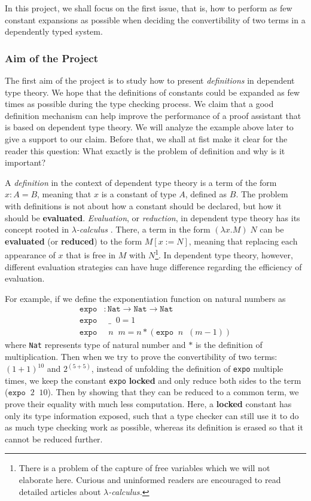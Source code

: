 \documentclass{article}
\theoremstyle{remark}
\begin{document}
In this project, we shall focus on the first issue, that is, how to perform as few constant expansions as possible when deciding the convertibility of two terms in a dependently typed system. 

\subsubsection{Aim of the Project}
The first aim of the project is to study how to present \emph{definitions} in dependent type theory. We hope that the definitions of constants could be expanded as few times as possible during the type checking process. We claim that a good definition mechanism can help improve the performance of a proof assistant that is based on dependent type theory. We will analyze the example above later to give a support to our claim. Before that, we shall at fist make it clear for the reader this question: What exactly is the problem of definition and why is it important?

A \emph{definition} in the context of dependent type theory is a term of the form $x : A = B$, meaning that $x$ is a constant of type $A$, defined as $B$. The problem with definitions is not about how a constant should be declared, but how it should be \textbf{evaluated}. \emph{Evaluation}, or \emph{reduction}, in dependent type theory has its concept rooted in \emph{$\lambda$-calculus} \cite{barendregt1984lambda}. There, a term in the form $(\lambda x . M) \;N$ can be \textbf{evaluated} (or \textbf{reduced}) to the form $M[x := N]$, meaning that replacing each appearance of $x$ that is free in $M$ with $N$\footnote{There is a problem of the capture of free variables which we will not elaborate here. Curious and uninformed readers are encouraged to read detailed articles about \emph{$\lambda$-calculus.}}. In dependent type theory, however, different evaluation strategies can have huge difference regarding the efficiency of evaluation. 

For example, if we define the exponentiation function on natural numbers as
\begin{align*}
  \texttt{expo} &: \texttt{Nat} \to \texttt{Nat} \to \texttt{Nat} \\
  \texttt{expo} &\;\; \_\;\; 0 = 1 \\
  \texttt{expo} &\;\; n \;\; m = n * (\texttt{expo} \;\; n \;\; (m - 1))
\end{align*}
where \texttt{Nat} represents type of natural number and $*$ is the definition of multiplication. Then when we try to prove the convertibility of two terms: $(1 + 1)^{10}$ and $2 ^ {(5+5)}$, instead of unfolding the definition of \texttt{expo} multiple times, we keep the constant \texttt{expo} \textbf{locked} and only reduce both sides to the term ($\texttt{expo} \;\; 2 \;\; 10$). Then by showing that they can be reduced to a common term, we prove their equality with much less computation. Here, a \textbf{locked} constant has only its type information exposed, such that a type checker can still use it to do as much type checking work as possible, whereas its definition is erased so that it cannot be reduced further.
\end{document}
